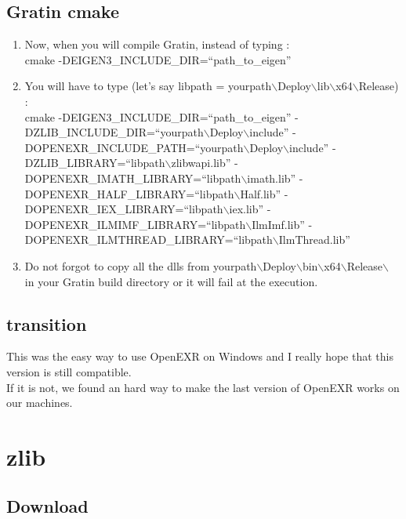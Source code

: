 \documentclass{beamer}
\begin{document}
\subsection{Gratin cmake}
\begin{frame}
  \begin{enumerate}
    \item Now, when you will compile Gratin, instead of typing : \\
      cmake -DEIGEN3\_INCLUDE\_DIR=``path\_to\_eigen''
    \item You will have to type (let's say libpath = yourpath$\backslash$Deploy$\backslash$lib$\backslash$x64$\backslash$Release) : \\
      cmake -DEIGEN3\_INCLUDE\_DIR=``path\_to\_eigen'' -DZLIB\_INCLUDE\_DIR=``yourpath$\backslash$Deploy$\backslash$include'' -DOPENEXR\_INCLUDE\_PATH=``yourpath$\backslash$Deploy$\backslash$include'' -DZLIB\_LIBRARY=``libpath$\backslash$zlibwapi.lib'' -DOPENEXR\_IMATH\_LIBRARY=``libpath$\backslash$imath.lib'' -DOPENEXR\_HALF\_LIBRARY=``libpath$\backslash$Half.lib'' -DOPENEXR\_IEX\_LIBRARY=``libpath$\backslash$iex.lib'' -DOPENEXR\_ILMIMF\_LIBRARY=``libpath$\backslash$IlmImf.lib'' -DOPENEXR\_ILMTHREAD\_LIBRARY=``libpath$\backslash$IlmThread.lib''
    \item Do not forgot to copy all the dlls from yourpath$\backslash$Deploy$\backslash$bin$\backslash$x64$\backslash$Release$\backslash$ in your Gratin build directory or it will fail at the execution.
  \end{enumerate}
\end{frame}

\subsection{transition}
\begin{frame}
  This was the easy way to use OpenEXR on Windows and I really hope that this version is still compatible. \\
  If it is not, we found an hard way to make the last version of OpenEXR works on our machines.
\end{frame}

\section{zlib}
\subsection{Download}
\end{document}
